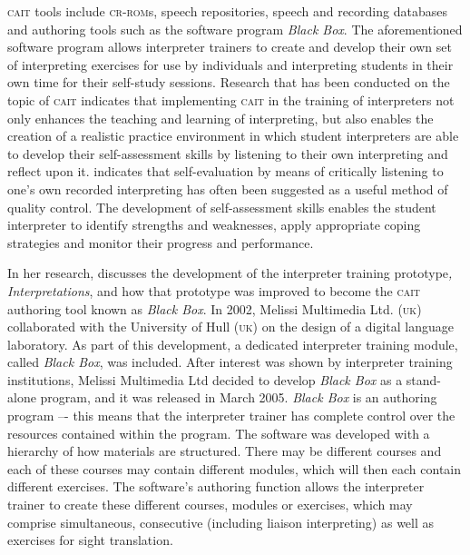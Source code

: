 \documentclass[output=paper]{langsci/langscibook}
\begin{document}
\textsc{cait} tools include \textsc{cr-rom}s, speech repositories, speech and recording data\-bases and authoring tools such as the software program \textit{Black Box}. The aforementioned software program allows interpreter trainers to create and develop their own set of interpreting exercises for use by individuals and interpreting students in their own time for their self-study sessions. Research that has been conducted on the topic of \textsc{cait} \citep{Sandrelli2007a,Pinazo2008,Lim2014} indicates that implementing \textsc{cait} in the training of interpreters not only enhances the teaching and learning of interpreting, but also enables the creation of a realistic practice environment in which student interpreters are able to develop their self-assessment skills by listening to their own interpreting and reflect upon it. \citet[252]{Bartlomiejczyk2007} indicates that self-evaluation by means of critically listening to one’s own recorded interpreting has often been suggested as a useful method of quality control. The development of self-assessment skills enables the student interpreter to identify strengths and weaknesses, apply appropriate coping strategies and monitor their progress and performance.

In her research, \citet{Sandrelli2007b} discusses the development of the interpreter training prototype\textit{, Interpretations}, and how that prototype was improved to become the \textsc{cait} authoring tool known as \textit{Black Box}. In 2002, Melissi Multimedia Ltd. (\textsc{uk}) collaborated with the University of Hull (\textsc{uk}) on the design of a digital language laboratory. As part of this development, a dedicated interpreter training module, called \textit{Black Box}, was included. After interest was shown by interpreter training institutions, Melissi Multimedia Ltd decided to develop \textit{Black Box} as a stand-alone program, and it was released in March 2005. \textit{Black Box} is an authoring program –- this means that the interpreter trainer has complete control over the resources contained within the program. The software was developed with a hierarchy of how materials are structured. There may be different courses and each of these courses may contain different modules, which will then each contain different exercises. The software’s authoring function allows the interpreter trainer to create these different courses, modules or exercises, which may comprise simultaneous, consecutive (including liaison interpreting) as well as exercises for sight translation. 
\end{document}
